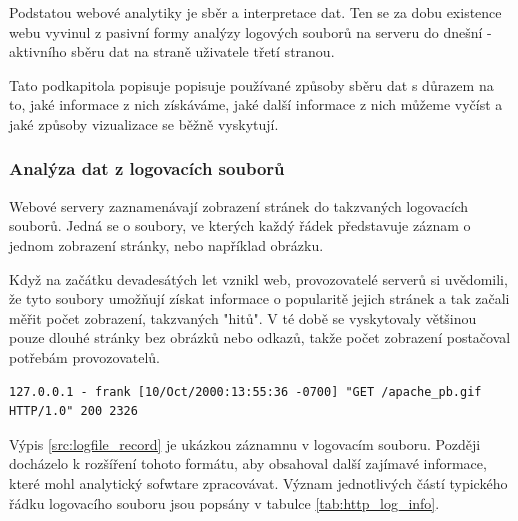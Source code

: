 \documentclass[bc,male,java,dept456]{diploma}						%
\begin{document}
Podstatou webové analytiky je sběr a interpretace dat. Ten se za dobu existence webu vyvinul z pasivní formy analýzy logových souborů na serveru do dnešní - aktivního sběru dat na straně uživatele třetí stranou.

Tato podkapitola popisuje popisuje používané způsoby sběru dat s důrazem na to, jaké informace z nich získáváme, jaké další informace z nich můžeme vyčíst a jaké způ\-so\-by vizualizace se běžně vyskytují.



\subsubsection{Analýza dat z logovacích souborů}

Webové servery zaznamenávají zobrazení stránek do takzvaných logovacích souborů. Jedná se o soubory, ve kterých každý řádek představuje záznam o jednom zobrazení stránky, nebo například obrázku.

Když na začátku devadesátých let vznikl web, provozovatelé serverů si uvědomili, že tyto soubory umožňují získat informace o popularitě jejich stránek a tak začali měřit počet zobrazení, takzvaných "hitů". V té době se vyskytovaly většinou pouze dlouhé stránky bez obrázků nebo odkazů, takže počet zobrazení postačoval potřebám provozovatelů.

\bigskip

\begin{lstlisting}[label=src:logfile_record,caption=Formát logovacího souboru]
127.0.0.1 - frank [10/Oct/2000:13:55:36 -0700] "GET /apache_pb.gif HTTP/1.0" 200 2326
\end{lstlisting}

\bigskip

Výpis \ref{src:logfile_record} je ukázkou záznamnu v logovacím souboru. Později docházelo k rozšíření tohoto formátu, aby obsahoval další zajímavé informace, které mohl analytický sofwtare zpracovávat. Význam jednotlivých částí typického řádku logovacího souboru jsou po\-psá\-ny v tabulce \ref{tab:http_log_info}.
\end{document}
